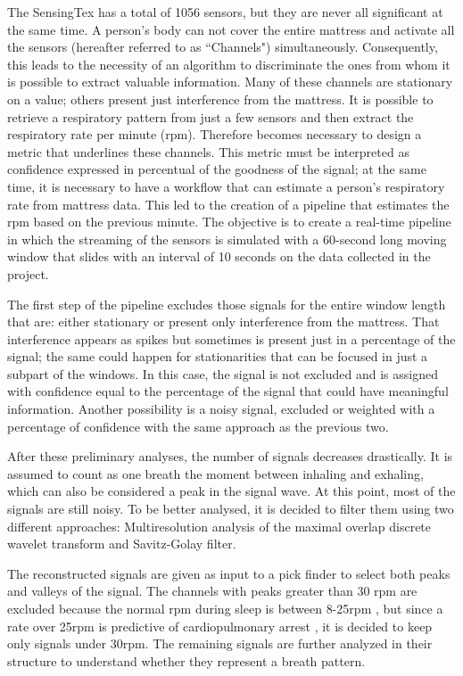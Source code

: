 The SensingTex has a total of 1056 sensors, but they are never all significant at the same time. A person's body can not cover the entire mattress and activate all the sensors (hereafter referred to as ``Channels") simultaneously. Consequently, this leads to the necessity of an algorithm to discriminate the ones from whom it is possible to extract valuable information.
Many of these channels are stationary on a value; others present just interference from the mattress. It is possible to retrieve a respiratory pattern from just a few sensors and then extract the respiratory rate per minute (rpm). Therefore becomes necessary to design a metric that underlines these channels. 
This metric must be interpreted as confidence expressed in percentual of the goodness of the signal; at the same time, it is necessary to have a workflow that can estimate a person’s respiratory rate from mattress data. This led to the creation of a pipeline that estimates the rpm based on the previous minute. The objective is to create a real-time pipeline in which the streaming of the sensors is simulated with a 60-second long moving window that slides with an interval of 10 seconds on the data collected in the project.


The first step of the pipeline excludes those signals for the entire window length that are: either stationary or present only interference from the mattress.
 That interference appears as spikes but sometimes is present just in a percentage of the signal; the same could happen for stationarities that can be focused in just a subpart of the windows. In this case, the signal is not excluded and is assigned with confidence equal to the percentage of the signal that could have meaningful information.
 Another possibility is a noisy signal, excluded or weighted with a percentage of confidence with the same approach as the previous two.
 
 After these preliminary analyses, the number of signals decreases drastically.
 It is assumed to count as one breath the moment between inhaling and exhaling, which can also be considered a peak in the signal wave.
 At this point, most of the signals are still noisy. To be better analysed, it is decided to filter them using two different approaches: Multiresolution analysis of the maximal overlap discrete wavelet transform and Savitz-Golay filter.


 The reconstructed signals are given as input to a pick finder to select both peaks and valleys of the signal. 
 The channels with peaks greater than 30 rpm are excluded because the normal rpm during sleep is between 8-25rpm \cite{Chourpiliadis2022PhysiologyRate}, but since a rate over 25rpm is predictive of cardiopulmonary arrest \cite{yuan2013respiratory}, it is decided to keep only signals under 30rpm.
 The remaining signals are further analyzed in their structure to understand whether they represent a breath pattern.
 
